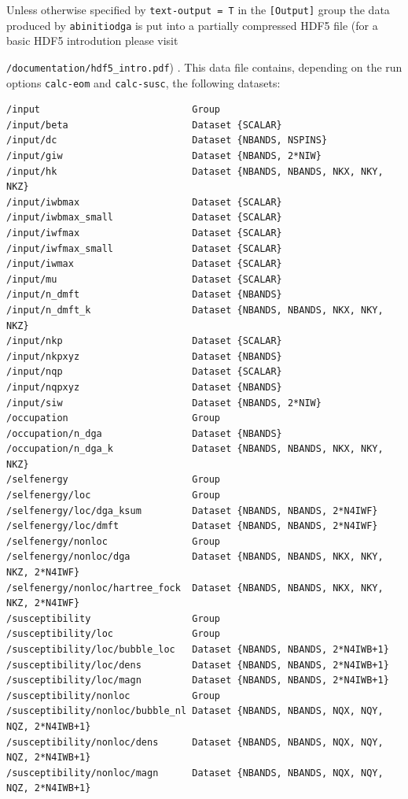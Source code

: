 \documentclass[a4paper,11pt]{article}
\numberwithin{equation}{section} %
\begin{document}
\newpage
Unless otherwise specified by \verb|text-output = T| in the {\color{red}\verb|[Output]|} group the data produced by \verb+abinitiodga+ is put into a partially compressed HDF5 file (for a basic HDF5 introdution please visit

{\color{blue}\verb+/documentation/hdf5_intro.pdf+}) . This data file contains, depending on the run options \verb|calc-eom| and \verb|calc-susc|, the following datasets:

\begin{lstlisting}[caption=ADGA HDF5 output format for a q-grid, frame=single, basicstyle=\small]
/input                           Group
/input/beta                      Dataset {SCALAR}
/input/dc                        Dataset {NBANDS, NSPINS}
/input/giw                       Dataset {NBANDS, 2*NIW}
/input/hk                        Dataset {NBANDS, NBANDS, NKX, NKY, NKZ}
/input/iwbmax                    Dataset {SCALAR}
/input/iwbmax_small              Dataset {SCALAR}
/input/iwfmax                    Dataset {SCALAR}
/input/iwfmax_small              Dataset {SCALAR}
/input/iwmax                     Dataset {SCALAR}
/input/mu                        Dataset {SCALAR}
/input/n_dmft                    Dataset {NBANDS}
/input/n_dmft_k                  Dataset {NBANDS, NBANDS, NKX, NKY, NKZ}
/input/nkp                       Dataset {SCALAR}
/input/nkpxyz                    Dataset {NBANDS}
/input/nqp                       Dataset {SCALAR}
/input/nqpxyz                    Dataset {NBANDS}
/input/siw                       Dataset {NBANDS, 2*NIW}
/occupation                      Group
/occupation/n_dga                Dataset {NBANDS}
/occupation/n_dga_k              Dataset {NBANDS, NBANDS, NKX, NKY, NKZ}
/selfenergy                      Group
/selfenergy/loc                  Group
/selfenergy/loc/dga_ksum         Dataset {NBANDS, NBANDS, 2*N4IWF}
/selfenergy/loc/dmft             Dataset {NBANDS, NBANDS, 2*N4IWF}
/selfenergy/nonloc               Group
/selfenergy/nonloc/dga           Dataset {NBANDS, NBANDS, NKX, NKY, NKZ, 2*N4IWF}
/selfenergy/nonloc/hartree_fock  Dataset {NBANDS, NBANDS, NKX, NKY, NKZ, 2*N4IWF}
/susceptibility                  Group
/susceptibility/loc              Group
/susceptibility/loc/bubble_loc   Dataset {NBANDS, NBANDS, 2*N4IWB+1}
/susceptibility/loc/dens         Dataset {NBANDS, NBANDS, 2*N4IWB+1}
/susceptibility/loc/magn         Dataset {NBANDS, NBANDS, 2*N4IWB+1}
/susceptibility/nonloc           Group
/susceptibility/nonloc/bubble_nl Dataset {NBANDS, NBANDS, NQX, NQY, NQZ, 2*N4IWB+1}
/susceptibility/nonloc/dens      Dataset {NBANDS, NBANDS, NQX, NQY, NQZ, 2*N4IWB+1}
/susceptibility/nonloc/magn      Dataset {NBANDS, NBANDS, NQX, NQY, NQZ, 2*N4IWB+1}
\end{lstlisting}
\end{document}
